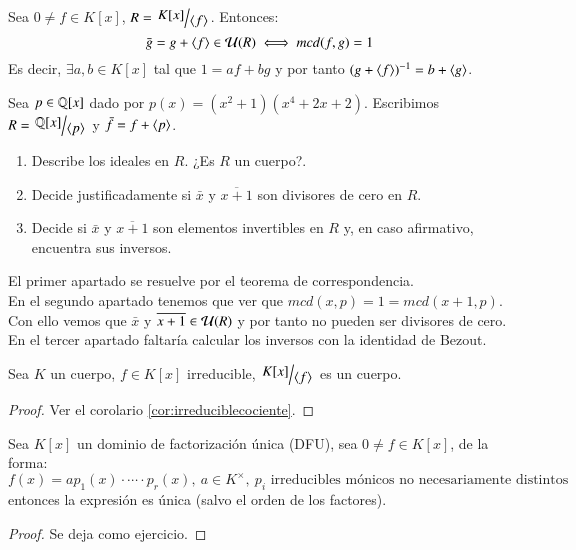 \begin{cor}
    Sea $0 \neq f \in K[x]$, $R = \quo{K[x]}{\gen{f}}$. Entonces:
    $$
        \bar g = g + \langle f\rangle \in \mathcal{U}(R) \iff mcd(f, g)=1
    $$
    Es decir, $\exists a, b \in K[x]$ tal que $1 = af + bg$ y por tanto $(g + \langle f\rangle)^{-1} = b + \langle g\rangle$.
\end{cor}

\begin{ex}[H1.24]
    Sea $p \in \mathbb{Q}[x]$ dado por $p(x) = (x^2+1)(x^4+2x+2)$. Escribimos $R = \quo{\Q[x]}{\gen{p}}$ y $\bar f = f + \langle p\rangle$.
    \begin{enumerate}
        \item Describe los ideales en $R$. ¿Es $R$ un cuerpo?.
        \item Decide justificadamente si $\bar x$ y $\overline{x+1}$ son divisores de cero en $R$.
        \item Decide si $\bar x$ y $\overline{x+1}$ son elementos invertibles en $R$ y, en caso afirmativo, encuentra sus inversos.
    \end{enumerate}

    El primer apartado se resuelve por el teorema de correspondencia.\\
    En el segundo apartado tenemos que ver que $mcd(x, p) = 1 = mcd(x+1, p)$. Con ello vemos que $\bar x$ y $\overline{x+1} \in \mathcal{U}(R)$ y por tanto no pueden ser divisores de cero.\\
    En el tercer apartado faltaría calcular los inversos con la identidad de Bezout.
\end{ex}

\begin{pro}
    Sea $K$ un cuerpo, $f \in K[x]$ irreducible, $\quo{K[x]}{\gen{f}}$ es un cuerpo.
\end{pro}
\begin{proof}
    Ver el corolario \ref{cor:irreduciblecociente}.
\end{proof}
\begin{thm}
    Sea $K[x]$ un dominio de factorización única (DFU), sea $0 \neq f \in K[x]$, de la forma:
    $$
        f(x) = ap_1(x) \cdot \cdots \cdot p_r(x),\ a\in K^\times,\ p_i \text{ irreducibles mónicos no necesariamente distintos}
    $$
    entonces la expresión es única (salvo el orden de los factores).
\end{thm}
\begin{proof}
    Se deja como ejercicio.
\end{proof}

